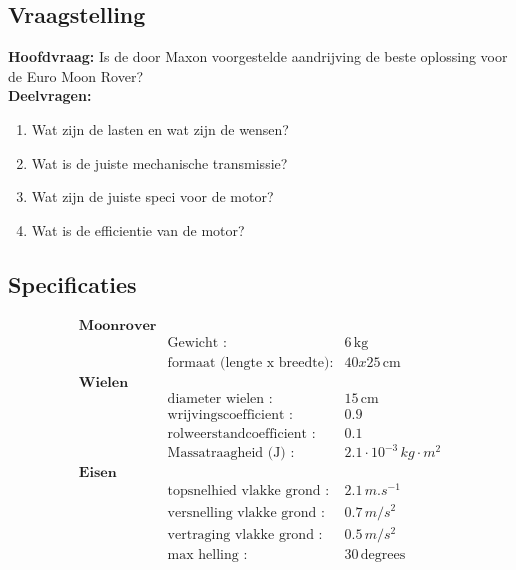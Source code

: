 \subsection{Vraagstelling}
\textbf{Hoofdvraag:}
Is de door Maxon voorgestelde aandrijving de beste oplossing voor de Euro Moon Rover?\\
\textbf{Deelvragen:}
\begin{enumerate}
    \item Wat zijn de lasten en wat zijn de wensen?
    \item Wat is de juiste mechanische transmissie?
    \item Wat zijn de juiste speci voor de motor?
    \item Wat is de efficientie van de motor?
\end{enumerate}

\subsection{Specificaties}
\begin{align*}
  \textbf{Moonrover}\\
  &\text{Gewicht :} & 6 \, \text{kg} \\
  &\text{formaat (lengte x breedte):} & 40x25 \, \text{cm}\\
  \textbf{Wielen}\\
  &\text{diameter wielen :} & 15 \, \text{cm}\\
  &\text{wrijvingscoefficient :} & 0.9 \, \\
  &\text{rolweerstandcoefficient :} & 0.1 \, \\
  &\text{Massatraagheid (J) :} & \text{$2.1 \cdot 10^{-3}$} \, \text{$kg \cdot m^{2}$}\\
  \textbf{Eisen}\\
  &\text{topsnelhied vlakke grond :} & 2.1 \, \text{$m.s^{-1}$}\\
  &\text{versnelling vlakke grond :} & 0.7 \, \text{$m/s^{2}$}\\
  &\text{vertraging vlakke grond :} & 0.5 \, \text{$m/s^{2}$}\\
  &\text{max helling :} & 30 \, \text{degrees}
\end{align*}